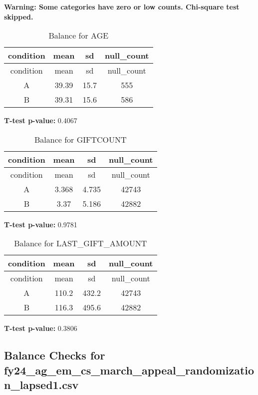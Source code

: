 \documentclass[
]{article}
\begin{document}
\textbf{Warning: Some categories have zero or low counts. Chi-square
test skipped.} \pagebreak

\begin{longtable}[]{@{}cccc@{}}
\caption{Balance for AGE}\tabularnewline
\toprule\noalign{}
condition & mean & sd & null\_count \\
\midrule\noalign{}
\endfirsthead
\toprule\noalign{}
condition & mean & sd & null\_count \\
\midrule\noalign{}
\endhead
\bottomrule\noalign{}
\endlastfoot
A & 39.39 & 15.7 & 555 \\
B & 39.31 & 15.6 & 586 \\
\end{longtable}

\textbf{T-test p-value:} 0.4067\\
\pagebreak

\begin{longtable}[]{@{}cccc@{}}
\caption{Balance for GIFTCOUNT}\tabularnewline
\toprule\noalign{}
condition & mean & sd & null\_count \\
\midrule\noalign{}
\endfirsthead
\toprule\noalign{}
condition & mean & sd & null\_count \\
\midrule\noalign{}
\endhead
\bottomrule\noalign{}
\endlastfoot
A & 3.368 & 4.735 & 42743 \\
B & 3.37 & 5.186 & 42882 \\
\end{longtable}

\textbf{T-test p-value:} 0.9781\\
\pagebreak

\begin{longtable}[]{@{}cccc@{}}
\caption{Balance for LAST\_GIFT\_AMOUNT}\tabularnewline
\toprule\noalign{}
condition & mean & sd & null\_count \\
\midrule\noalign{}
\endfirsthead
\toprule\noalign{}
condition & mean & sd & null\_count \\
\midrule\noalign{}
\endhead
\bottomrule\noalign{}
\endlastfoot
A & 110.2 & 432.2 & 42743 \\
B & 116.3 & 495.6 & 42882 \\
\end{longtable}

\textbf{T-test p-value:} 0.3806\\
\pagebreak \clearpage

\subsection{Balance Checks for
fy24\_ag\_em\_cs\_march\_appeal\_randomization\_lapsed1.csv}\label{balance-checks-for-fy24_ag_em_cs_march_appeal_randomization_lapsed1.csv}
\end{document}
